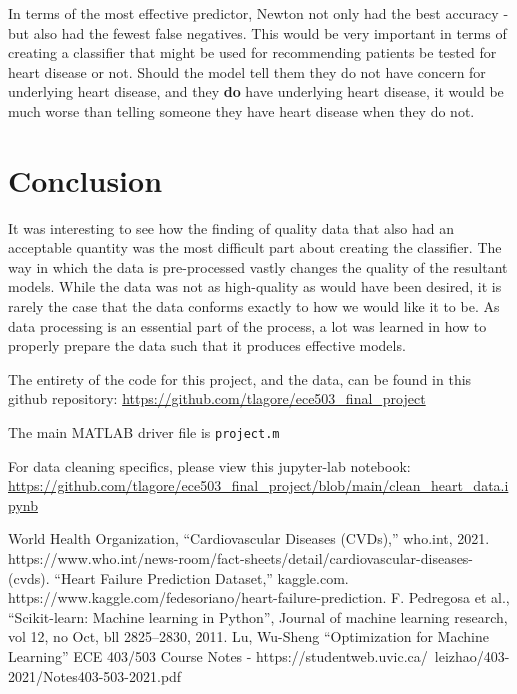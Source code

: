 \documentclass[12pt,conference]{IEEEtran}
\begin{document}
In terms of the most effective predictor, Newton not only had the best accuracy - but also had the fewest false negatives. This would be very important in terms of creating a classifier that might be used for recommending patients be tested for heart disease or not. Should the model tell them they do not have concern for underlying heart disease, and they \textbf{do} have underlying heart disease, it would be much worse than telling someone they have heart disease when they do not.

\section{Conclusion}
It was interesting to see how the finding of quality data that also had an acceptable quantity was the most difficult part about creating the classifier. The way in which the data is pre-processed vastly changes the quality of the resultant models. While the data was not as high-quality as would have been desired, it is rarely the case that the data conforms exactly to how we would like it to be. As data processing is an essential part of the process, a lot was learned in how to properly prepare the data such that it produces effective models.

The entirety of the code for this project, and the data, can be found in this github repository: \href{https://github.com/tlagore/ece503\_final\_project}{https://github.com/tlagore/ece503\_final\_project}

The main MATLAB driver file is \verb|project.m|

For data cleaning specifics, please view this jupyter-lab notebook:
\\
\href{https://github.com/tlagore/ece503\_final\_project/blob/main/clean_heart_data.ipynb}{https://github.com/tlagore/ece503\_final\_project/blob/main/clean\_heart\_data.ipynb}

\begin{thebibliography}{00}
 World Health Organization, “Cardiovascular Diseases (CVDs),” who.int, 2021. https://www.who.int/news-room/fact-sheets/detail/cardiovascular-diseases-(cvds).
 “Heart Failure Prediction Dataset,” kaggle.com. https://www.kaggle.com/fedesoriano/heart-failure-prediction.
 F. Pedregosa et al., “Scikit-learn: Machine learning in Python”, Journal of machine learning research, vol 12, no Oct, bll 2825–2830, 2011.
Lu, Wu-Sheng “Optimization for Machine Learning” ECE 403/503 Course Notes - https://studentweb.uvic.ca/~leizhao/403-2021/Notes403-503-2021.pdf
\end{thebibliography}
\end{document}
